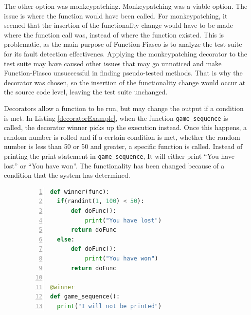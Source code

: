The other option was monkeypatching. Monkeypatching was a viable option. The issue is where the function would have been called. For monkeypatching, it seemed that the insertion of the functionality change would have to be made where the function call was, instead of where the function existed. This is problematic, as the main purpose of Function-Fiasco is to analyze the test suite for its fault detection effectivenes. Applying the monkeypatching decorator to the test suite may have caused other issues that may go unnoticed and make Function-Fiasco unsuccessful in finding pseudo-tested methods. That is why the decorator was chosen, so the insertion of the functionality change would occur at the source code level, leaving the test suite unchanged.

Decorators allow a function to be run, but may change the output if a condition is met. In Listing \ref{decoratorExample}, when the function \texttt{game\_sequence} is called, the decorator winner picks up the execution instead. Once this happens, a random number is rolled and if a certain condition is met, whether the random number is less than 50 or 50 and greater, a specific function is called. Instead of printing the print statement in \texttt{game\_sequence}, It will either print ``You have lost'' or ``You have won''. The functionality has been changed because of a condition that the system has determined.

\begin{figure}[t!]
\begin{lstlisting}[language = Python, numbers = left, frame = single, caption = Example of a decorator., label = decoratorExample]
def winner(func):
  if(randint(1, 100) < 50):
      def doFunc():
          print("You have lost")
      return doFunc
  else:
      def doFunc():
          print("You have won")
      return doFunc

@winner
def game_sequence():
  print("I will not be printed")
\end{lstlisting}
\end{figure}

